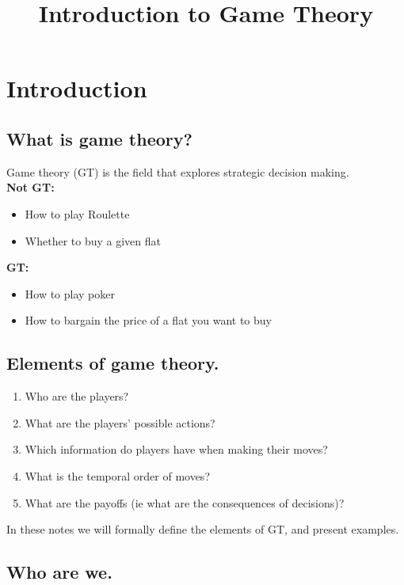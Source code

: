 \documentclass{article}
\title{Introduction to Game Theory}
\date{}
\begin{document}
\maketitle

\section{Introduction}

\subsection{What is game theory?}
Game theory (GT) is the field that explores strategic decision making. \\

\textbf{Not GT:}
\begin{itemize}
    \item How to play Roulette
    \item Whether to buy a given flat
\end{itemize}

\textbf{GT:}
\begin{itemize}
    \item How to play poker
    \item How to bargain the price of a flat you want to buy
\end{itemize}

\subsection{Elements of game theory.}

\begin{enumerate}
    \item Who are the players?
    \item What are the players' possible actions?
    \item Which information do players have when making their moves?
    \item What is the temporal order of moves?
    \item What are the payoffs (ie what are the consequences of decisions)?
\end{enumerate}

In these notes we will formally define the elements of GT, and present examples.

\subsection{Who are we.}
\end{document}
